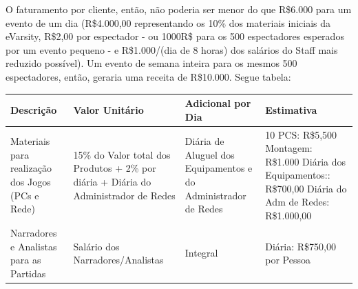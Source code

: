 \documentclass[a4paper, 12pt]{paper}
\begin{document}
O faturamento por cliente, então, não poderia ser menor do que R\$6.000 para um evento de um dia (R\$4.000,00 representando os 10\% dos materiais iniciais da eVarsity, R\$2,00 por espectador - ou 1000R\$ para os 500 espectadores esperados por um evento pequeno - e R\$1.000/(dia de 8 horas) dos salários do Staff mais reduzido possível). Um evento de semana inteira para os mesmos 500 espectadores, então, geraria uma receita de R\$10.000. Segue tabela:
\begin{table}[ht]
	\centering
	\begin{tabular}{p{3.5cm}p{3.5cm}p{3.5cm}p{3.5cm}}
		\hline
		\cellcolor{gray}Descrição&\cellcolor{gray}Valor Unitário&\cellcolor{gray}Adicional por Dia&\cellcolor{gray}Estimativa\\
		\hline
		Materiais para realização dos Jogos (PCs e Rede)&15\% do Valor total dos Produtos + 2\% por diária + Diária do Administrador de Redes&Diária de Aluguel dos Equipamentos e do Administrador de Redes&10 PCS: R\$5,500
		Montagem: R\$1.000
		Diária dos Equipamentos:: R\$700,00
		Diária do Adm de Redes: R\$1.000,00\\	
		\hline			
		Narradores e Analistas para as Partidas&Salário dos Narradores/Analistas&Integral&Diária: R\$750,00 por Pessoa\\
		\hline							
	\end{tabular}
\end{table}	
\end{document}
